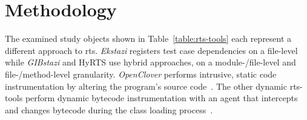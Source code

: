\section{Methodology}



The examined study objects shown in Table~\ref{table:rts-tools} each represent a different approach
to \ac{rts}. \emph{Ekstazi} registers test case dependencies on a file-level while \emph{GIBstazi} and HyRTS
use hybrid approaches, on a module-/file-level and file-/method-level granularity. \emph{OpenClover}
performs intrusive, static code instrumentation by altering the program's source code~\cite{clover_documentation,java_instrumentation}. The
other dynamic \ac{rts}-tools perform dynamic bytecode instrumentation with an agent that intercepts
and changes bytecode during the class loading process~\cite{hyrts_paper,ekstazimain,java_instrumentation}.

